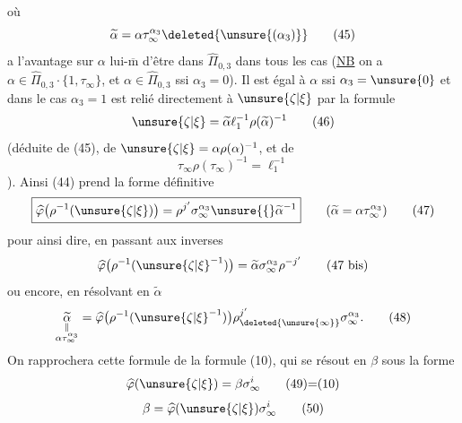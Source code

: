où 
\[
\widetilde\alpha=\alpha\tau_\infty^{\alpha_3}\deleted{\unsure{(\alpha_3)}}
\tag{45}
\]
a l'avantage sur $\alpha$ lui-$\overline{\mathrm m}$ d'être dans $\widehat\Pi_{0,3}$ dans tous les cas (\uline{NB} on a
$\alpha\in\widehat\Pi_{0,3}\cdot\{1,\tau_\infty\}$, et $\alpha\in\widehat\Pi_{0,3}$ ssi $\alpha_3=0$).
Il est égal à $\alpha$ ssi $\alpha_3=\unsure{0}$ et dans le cas $\alpha_3=1$  est relié directement à $\unsure{\zeta|\xi}$ par la formule
\[
\unsure{\zeta|\xi}=\widetilde\alpha\ell_1^{-1}\rho(\widetilde\alpha)^{-1}
\tag{46}
\]
(déduite de (45), de $\unsure{\zeta|\xi}=\alpha\rho(\alpha)^{-1}$, et de
\[
\tau_\infty\rho(\tau_\infty)^{-1}=\ell_1^{-1}
\tag{**}
\]
).
Ainsi (44) prend la forme définitive
\[
\boxed{\widehat{\varphi}\bigl(\rho^{-1}(\unsure{\zeta|\xi})\bigr)=\rho^{j'}\sigma_\infty^{\alpha_3}\unsure{\lbrace}\widetilde\alpha^{-1}}
\qquad(\widetilde\alpha=\alpha\tau_\infty^{\alpha_3})
\tag{47}
\]
pour ainsi dire, en passant aux inverses
\[
\widehat{\varphi}\bigl(\rho^{-1}(\unsure{\zeta|\xi}^{-1})\bigr)=\widetilde\alpha\sigma_\infty^{\alpha_3}\rho^{-j'}
\tag{47 bis}
\]
ou encore, en résolvant en $\widetilde\alpha$
\[
\underset{\substack{\Vert\\\alpha\tau_\infty^{\alpha_3}}}{\widetilde\alpha}
=\widehat{\varphi}\bigl(\rho^{-1}(\unsure{\zeta|\xi}^{-1})\bigr)\rho_{\deleted{\unsure{\infty}}}^{j'}\sigma_\infty^{\alpha_3}.
\tag{48}
\]
On rapprochera cette formule de la formule (10), qui se résout en $\beta$ sous la forme
\[
\widehat{\varphi}(\unsure{\zeta|\xi})=\beta\sigma_\infty^i
\tag*{(49)=(10)}
\]
\[
\beta=\widehat{\varphi}(\unsure{\zeta|\xi})\sigma_\infty^i
\tag{50}
\]


